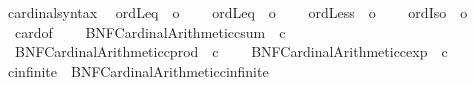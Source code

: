 \begin{isabellebody}
\isanewline
{}\isamarkupfalse%
\ cardinal{\isacharunderscore}{\kern0pt}syntax\isanewline
{}\isanewline
\isanewline
{}\isamarkupfalse%
\isanewline
\ \ ordLeq{}\ {\isacharparenleft}{\kern0pt}\ {\isachardoublequoteopen}{\isacharless}{\kern0pt}{\isacharequal}{\kern0pt}o{\isachardoublequoteclose}\ {}{}{\isacharparenright}{\kern0pt}\ \isanewline
\ \ ordLeq{}\ {\isacharparenleft}{\kern0pt}\ {\isachardoublequoteopen}{\isasymle}o{\isachardoublequoteclose}\ {}{}{\isacharparenright}{\kern0pt}\ \isanewline
\ \ ordLess{}\ {\isacharparenleft}{\kern0pt}\ {\isachardoublequoteopen}{\isacharless}{\kern0pt}o{\isachardoublequoteclose}\ {}{}{\isacharparenright}{\kern0pt}\ \isanewline
\ \ ordIso{}\ {\isacharparenleft}{\kern0pt}\ {\isachardoublequoteopen}{\isacharequal}{\kern0pt}o{\isachardoublequoteclose}\ {}{}{\isacharparenright}{\kern0pt}\ \isanewline
\ \ card{\isacharunderscore}{\kern0pt}of\ {\isacharparenleft}{\kern0pt}{\isachardoublequoteopen}{\isacharbar}{\kern0pt}{\isacharunderscore}{\kern0pt}{\isacharbar}{\kern0pt}{\isachardoublequoteclose}{\isacharparenright}{\kern0pt}\ \isanewline
\ \ BNF{\isacharunderscore}{\kern0pt}Cardinal{\isacharunderscore}{\kern0pt}Arithmetic{\isachardot}{\kern0pt}csum\ {\isacharparenleft}{\kern0pt}\ {\isachardoublequoteopen}{\isacharplus}{\kern0pt}c{\isachardoublequoteclose}\ {}{}{\isacharparenright}{\kern0pt}\ \isanewline
\ \ BNF{\isacharunderscore}{\kern0pt}Cardinal{\isacharunderscore}{\kern0pt}Arithmetic{\isachardot}{\kern0pt}cprod\ {\isacharparenleft}{\kern0pt}\ {\isachardoublequoteopen}{\isacharasterisk}{\kern0pt}c{\isachardoublequoteclose}\ {}{}{\isacharparenright}{\kern0pt}\ \isanewline
\ \ BNF{\isacharunderscore}{\kern0pt}Cardinal{\isacharunderscore}{\kern0pt}Arithmetic{\isachardot}{\kern0pt}cexp\ {\isacharparenleft}{\kern0pt}\ {\isachardoublequoteopen}{\isacharcircum}{\kern0pt}c{\isachardoublequoteclose}\ {}{}{\isacharparenright}{\kern0pt}\isanewline
\isanewline
{}\isamarkupfalse%
\ cinfinite\ {\isacharequal}{\kern0pt}\ BNF{\isacharunderscore}{\kern0pt}Cardinal{\isacharunderscore}{\kern0pt}Arithmetic{\isachardot}{\kern0pt}cinfinite\isanewline

\end{isabellebody}
